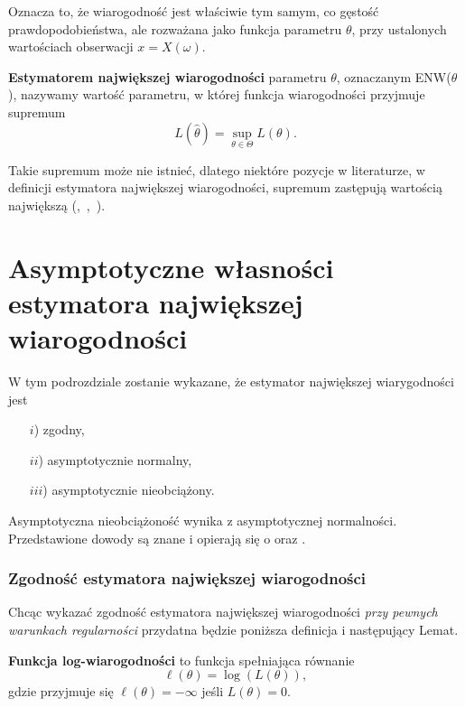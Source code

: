 Oznacza to, że wiarogodność jest właściwie tym samym, co gęstość prawdopodobieństwa,
ale rozważana jako funkcja parametru $\theta$, przy ustalonych wartościach obserwacji
$x = X(\omega)$.


\begin{definition}
\textbf{Estymatorem największej wiarogodności} parametru $\theta$, oznaczanym ENW($\theta$), nazywamy wartość parametru, w której funkcja
wiarogodności przyjmuje supremum $$L(\hat{\theta}) = \sup_{\theta \in \Theta} L(\theta).$$

\end{definition}

Takie supremum może nie istnieć, dlatego niektóre pozycje w literaturze, w definicji estymatora największej wiarogodności, supremum zastępują wartością największą (\cite{rydl1},~\cite{sfu1},~\cite{mit0}).

\section{Asymptotyczne własności estymatora największej wiarogodności}

W tym podrozdziale zostanie wykazane, że estymator największej wiarygodności jest
\begin{enumerate}
\item[$i$)] zgodny,
\item[$ii$)] asymptotycznie normalny,
\item[$iii$)] asymptotycznie nieobciążony.
\end{enumerate}

Asymptotyczna nieobciążoność wynika z asymptotycznej normalności. Przedstawione dowody są znane i opierają się o \cite{mit1} oraz \cite{sfu1}.



\subsubsection{Zgodność estymatora największej wiarogodności}

Chcąc wykazać zgodność estymatora największej wiarogodności \textit{przy pewnych warunkach regularności}
przydatna będzie poniższa definicja i następujący Lemat.
\begin{definition}
\textbf{Funkcja log-wiarogodności} to funkcja spełniająca równanie
$$\ell(\theta) = \log(L(\theta)),$$
gdzie przyjmuje się $\ell(\theta) = -\infty$ jeśli $L(\theta) = 0$.
\end{definition}


